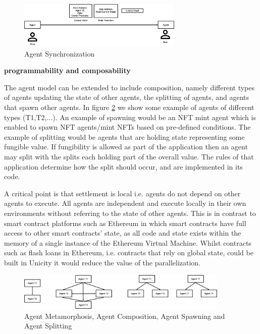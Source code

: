 \documentclass{article}
\begin{document}
\vspace{2mm}

\begin{figure}[H]
    \centering
    \includegraphics[width=0.7\textwidth]{AgentSynchronization.png}
    \caption{Agent Synchronization}
    \label{fig:AgentSynch}
\end{figure}

\vspace{2mm}

\textbf{programmability and composability}

\vspace{2mm}

The agent model can be extended to include composition, namely different types of agents updating the state of other agents, the splitting of agents, and agents that spawn other agents. In figure \ref{fig:AgentSpawn} we show some example of agents of different types (T1,T2,...). An example of spawning would be an NFT mint agent which is enabled to spawn NFT agents/mint NFTs based on pre-defined conditions. The example of splitting would be agents that are holding state representing some fungible value. If fungibility is allowed as part of the application then an agent may split with the splits each holding part of the overall value. The rules of that application determine how the split should occur, and are implemented in its code.

\vspace{2mm}

A critical point is that settlement is local i.e. agents do not depend on other agents to execute. All agents are independent and execute locally in their own environments without referring  to the state of other agents. This is in contrast to smart contract platforms such as Ethereum in which smart contracts have full access to other smart contracts' state, as all code and state exists within the memory of a single instance of the Ethereum Virtual Machine. Whilst contracts such as flash loans in Ethereum, i.e. contracts that rely on global state, could be built in Unicity it would reduce the value of the parallelization.


\begin{figure}[H]
    \centering
    \includegraphics[width=0.9\textwidth]{AgentSpawn.png}
    \caption{Agent Metamorphosis, Agent Composition, Agent Spawning and Agent Splitting}
    \label{fig:AgentSpawn}
\end{figure}
\end{document}
